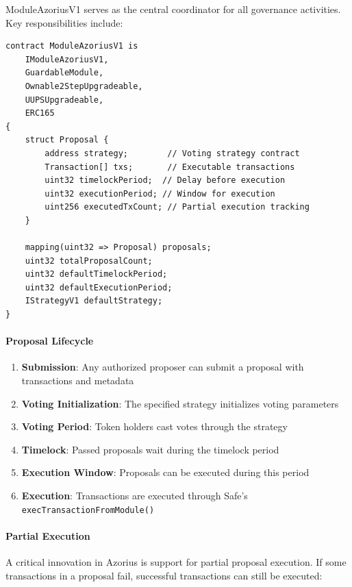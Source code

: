 ModuleAzoriusV1 serves as the central coordinator for all governance activities. Key responsibilities include:

\begin{lstlisting}[caption=ModuleAzoriusV1 Core Structure]
contract ModuleAzoriusV1 is
    IModuleAzoriusV1,
    GuardableModule,
    Ownable2StepUpgradeable,
    UUPSUpgradeable,
    ERC165
{
    struct Proposal {
        address strategy;        // Voting strategy contract
        Transaction[] txs;       // Executable transactions
        uint32 timelockPeriod;  // Delay before execution
        uint32 executionPeriod; // Window for execution
        uint256 executedTxCount; // Partial execution tracking
    }

    mapping(uint32 => Proposal) proposals;
    uint32 totalProposalCount;
    uint32 defaultTimelockPeriod;
    uint32 defaultExecutionPeriod;
    IStrategyV1 defaultStrategy;
}
\end{lstlisting}

\paragraph{Proposal Lifecycle}

\begin{enumerate}
    \item \textbf{Submission}: Any authorized proposer can submit a proposal with transactions and metadata
    \item \textbf{Voting Initialization}: The specified strategy initializes voting parameters
    \item \textbf{Voting Period}: Token holders cast votes through the strategy
    \item \textbf{Timelock}: Passed proposals wait during the timelock period
    \item \textbf{Execution Window}: Proposals can be executed during this period
    \item \textbf{Execution}: Transactions are executed through Safe's \texttt{execTransactionFromModule()}
\end{enumerate}

\paragraph{Partial Execution}

A critical innovation in Azorius is support for partial proposal execution. If some transactions in a proposal fail, successful transactions can still be executed:

